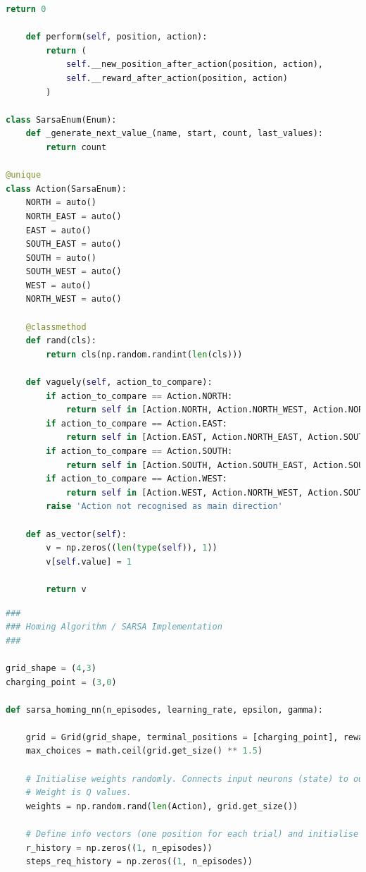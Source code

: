 \documentclass[11pt,journal,transmag,final]{IEEEtran}
\begin{document}
\begin{appendices}
\begin{lstlisting}[language=Python, caption=Classes, basicstyle=\footnotesize, label=lst:classes]
        return 0
    
    def perform(self, position, action):
        return (
            self.__new_position_after_action(position, action),
            self.__reward_after_action(position, action)
        )

class SarsaEnum(Enum):
    def _generate_next_value_(name, start, count, last_values):
        return count
    
@unique
class Action(SarsaEnum):
    NORTH = auto()
    NORTH_EAST = auto()
    EAST = auto()
    SOUTH_EAST = auto()
    SOUTH = auto()
    SOUTH_WEST = auto()
    WEST = auto()
    NORTH_WEST = auto()
    
    @classmethod
    def rand(cls):
        return cls(np.random.randint(len(cls)))
    
    def vaguely(self, action_to_compare):
        if action_to_compare == Action.NORTH:
            return self in [Action.NORTH, Action.NORTH_WEST, Action.NORTH_EAST]
        if action_to_compare == Action.EAST:
            return self in [Action.EAST, Action.NORTH_EAST, Action.SOUTH_EAST]
        if action_to_compare == Action.SOUTH:
            return self in [Action.SOUTH, Action.SOUTH_EAST, Action.SOUTH_WEST]
        if action_to_compare == Action.WEST:
            return self in [Action.WEST, Action.NORTH_WEST, Action.SOUTH_WEST]
        raise 'Action not recognised as main direction'
    
    def as_vector(self):
        v = np.zeros((len(type(self)), 1))
        v[self.value] = 1

        return v
        \end{lstlisting}

        \begin{lstlisting}[language=Python, caption=SARSA Algorithm Implementation, basicstyle=\footnotesize, label=lst:sarsa]
###
### Homing Algorithm / SARSA Implementation
###

grid_shape = (4,3)
charging_point = (3,0)

def sarsa_homing_nn(n_episodes, learning_rate, epsilon, gamma):
    
    grid = Grid(grid_shape, terminal_positions = [charging_point], rewards=[(charging_point, 1)])
    max_choices = math.ceil(grid.get_size() ** 1.5)

    # Initialise weights randomly. Connects input neurons (state) to output neurons (actions).
    # Weight is Q values.
    weights = np.random.rand(len(Action), grid.get_size())

    # Define info vectors (one position for each trial) and initialise it to zero
    r_history = np.zeros((1, n_episodes))
    steps_req_history = np.zeros((1, n_episodes))


\end{lstlisting}
\end{appendices}
\end{document}

